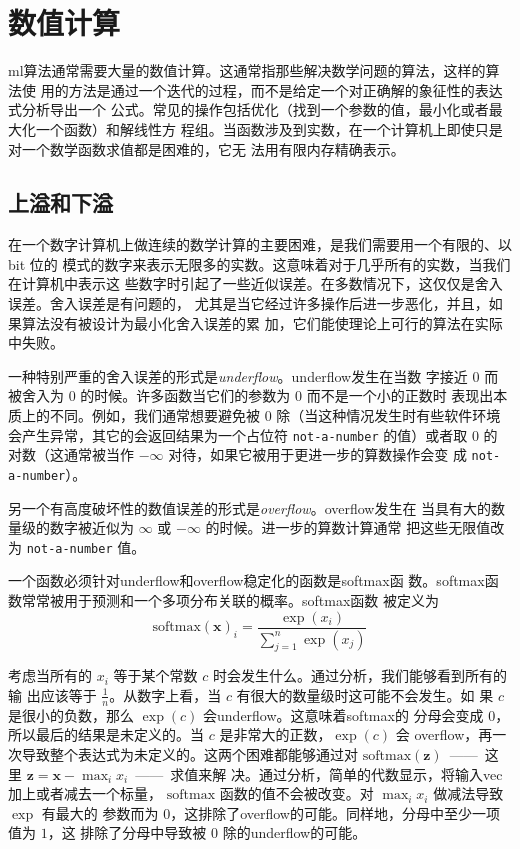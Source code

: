 \chapter{数值计算}
\label{ch:numerical}

\gls*{ml}算法通常需要大量的数值计算。这通常指那些解决数学问题的算法，这样的算法使
用的方法是通过一个迭代的过程，而不是给定一个对正确解的象征性的表达式分析导出一个
公式。常见的操作包括优化（找到一个参数的值，最小化或者最大化一个函数）和解线性方
程组。当函数涉及到实数，在一个计算机上即使只是对一个数学函数求值都是困难的，它无
法用有限内存精确表示。

\section{上溢和下溢}
\label{sec:overflow_and_underflow}

在一个数字计算机上做连续的数学计算的主要困难，是我们需要用一个有限的、以 bit 位的
模式的数字来表示无限多的实数。这意味着对于几乎所有的实数，当我们在计算机中表示这
些数字时引起了一些近似误差。在多数情况下，这仅仅是舍入误差。舍入误差是有问题的，
尤其是当它经过许多操作后进一步恶化，并且，如果算法没有被设计为最小化舍入误差的累
加，它们能使理论上可行的算法在实际中失败。

一种特别严重的舍入误差的形式是\emph{\gls{underflow}}。\gls*{underflow}发生在当数
字接近 $0$ 而被舍入为 $0$ 的时候。许多函数当它们的参数为 $0$ 而不是一个小的正数时
表现出本质上的不同。例如，我们通常想要避免被 $0$ 除（当这种情况发生时有些软件环境
会产生异常，其它的会返回结果为一个占位符 \verb!not-a-number! 的值）或者取 $0$ 的
对数（这通常被当作 $-\infty$ 对待，如果它被用于更进一步的算数操作会变
成 \verb!not-a-number!）。

另一个有高度破坏性的数值误差的形式是\emph{\gls{overflow}}。\gls*{overflow}发生在
当具有大的数量级的数字被近似为 $\infty$ 或 $-\infty$ 的时候。进一步的算数计算通常
把这些无限值改为 \verb!not-a-number! 值。

一个函数必须针对\gls*{underflow}和\gls*{overflow}稳定化的函数是\gls*{softmax}函
数。\gls*{softmax}函数常常被用于预测和一个多项分布关联的概率。\gls*{softmax}函数
被定义为
\begin{equation}
  \mathrm{softmax}(\pmb{x})_i = \frac{\exp(x_i)}{\sum_{j=1}^n\exp(x_j)}
\end{equation}

考虑当所有的 $x_i$ 等于某个常数 $c$ 时会发生什么。通过分析，我们能够看到所有的输
出应该等于 $\frac{1}{n}$。从数字上看，当 $c$ 有很大的数量级时这可能不会发生。如
果 $c$ 是很小的负数，那么 $\exp(c)$ 会\gls*{underflow}。这意味着\gls*{softmax}的
分母会变成 $0$，所以最后的结果是未定义的。当 $c$ 是非常大的正数，$\exp(c)$ 会
\gls*{overflow}，再一次导致整个表达式为未定义的。这两个困难都能够通过对
$\mathrm{softmax}(\pmb{z})$~——~这里 $\pmb{z} = \pmb{x} - \max_ix_i$~——~求值来解
决。通过分析，简单的代数显示，将输入\gls*{vec}加上或者减去一个标量，
$\mathrm{softmax}$ 函数的值不会被改变。对 $\max_ix_i$ 做减法导致 $\exp$ 有最大的
参数而为 $0$，这排除了\gls*{overflow}的可能。同样地，分母中至少一项值为 $1$，这
排除了分母中导致被 $0$ 除的\gls*{underflow}的可能。

